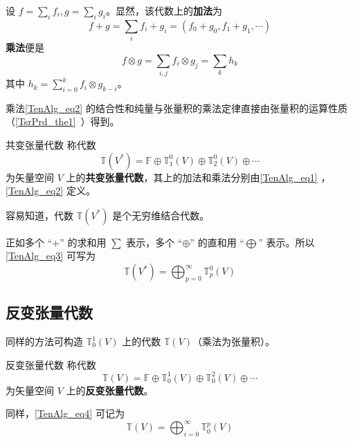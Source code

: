 设 $f=\sum\limits_ i f_i,g=\sum\limits_ i g_i$。显然，该代数上的\textbf{加法}为
\begin{equation}\label{TenAlg_eq1}
f+g=\sum_{i}f_i+g_i=(f_0+g_0,f_1+g_1,\cdots)
\end{equation}
\textbf{乘法}便是
\begin{equation}\label{TenAlg_eq2}
f\otimes g=\sum_{i,j}f_i\otimes g_j=\sum_k h_k
\end{equation}
其中 $h_k=\sum\limits_{i=0}^k f_i\otimes g_{k-i}$。

乘法\autoref{TenAlg_eq2} 的结合性和纯量与张量积的乘法定律直接由张量积的运算性质（\autoref{TsrPrd_the1}~）得到。

\begin{definition}{共变张量代数}
称代数
\begin{equation}\label{TenAlg_eq3}
\mathbb T(V^*)=\mathbb F\oplus\mathbb T_1^0(V)\oplus\mathbb T_2^0(V)\oplus\cdots
\end{equation}
为矢量空间 $V$ 上的\textbf{共变张量代数}，其上的加法和乘法分别由\autoref{TenAlg_eq1} ，\autoref{TenAlg_eq2} 定义。
\end{definition}

容易知道，代数 $\mathbb T(V^*)$ 是个无穷维结合代数。

正如多个 “+” 的求和用 $\sum$ 表示，多个 “$\oplus$” 的直和用 “$\bigoplus$” 表示。所以\autoref{TenAlg_eq3} 可写为
\begin{equation}
\mathbb T(V^*)=\bigoplus_{p=0}^\infty\mathbb T_p^0(V)
\end{equation}
 
\subsection{反变张量代数}
同样的方法可构造 $\mathbb T^1_0(V)$ 上的代数 $\mathbb T(V)$（乘法为张量积）。
\begin{definition}{反变张量代数}
称代数
\begin{equation}\label{TenAlg_eq4}
\mathbb T(V)=\mathbb F\oplus\mathbb T_0^1(V)\oplus\mathbb T_0^2(V)\oplus\cdots
\end{equation}
为矢量空间 $V$ 上的\textbf{反变张量代数}。
\end{definition}

同样，\autoref{TenAlg_eq4} 可记为
\begin{equation}
\mathbb T(V)=\bigoplus_{i=0}^\infty \mathbb T_0^p(V)
\end{equation}

